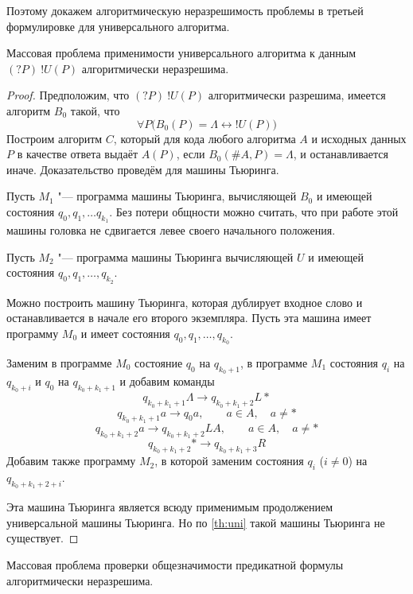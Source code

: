 Поэтому докажем алгоритмическую неразрешимость проблемы в третьей формулировке для универсального алгоритма.

\begin{lemma}
	Массовая проблема применимости универсального алгоритма к данным $ (?P)~!U(P) $ алгоритмически неразрешима.
\end{lemma}

\begin{proof}
	Предположим, что $ (?P)~!U(P) $ алгоритмически разрешима, \ie имеется алгоритм $ B_0 $ такой, что
	$$ \forall P \bigl( B_0(P) = \Lambda \leftrightarrow !U(P) \bigr) $$
	Построим алгоритм $ C $, который для кода любого алгоритма $ A $ и исходных данных $ P $ в качестве ответа выдаёт $ A(P) $, если $ B_0(\#A, P) = \Lambda $, и останавливается иначе.
	Доказательство проведём для машины Тьюринга.

	Пусть $ M_1 $ "--- программа машины Тьюринга, вычисляющей $ B_0 $ и имеющей состояния $ q_0, q_1, \dots q_{k_1} $.
	Без потери общности можно считать, что при работе этой машины головка не сдвигается левее своего начального положения.

	Пусть $ M_2 $ "--- программа машины Тьюринга вычисляющей $ U $ и имеющей состояния $ q_0, q_1, \dots, q_{k_2} $.

	Можно построить машину Тьюринга, которая дублирует входное слово и останавливается в начале его второго экземпляра.
	Пусть эта машина имеет программу $ M_0 $ и имеет состояния $ q_0, q_1, \dots, q_{k_0} $.

	Заменим в программе $ M_0 $ состояние $ q_0 $ на $ q_{k_0 + 1} $, в программе $ M_1 $ состояния $ q_i $ на $ q_{k_0 + i} $ и $ q_0 $ на $ q_{k_0 + k_1 + 1} $ и добавим команды
	$$ q_{k_0 + k_1 + 1} \Lambda \to q_{k_0 + k_1 + 2} L * $$
	$$ q_{k_0 + k_1 + 1} a \to q_0 a, \qquad a \in A, \quad a \ne * $$
	$$ q_{k_0 + k_1 + 2}a \to q_{k_0 + k_1 + 2} L A, \qquad a \in A, \quad a \ne * $$
	$$ q_{k_0 + k_1 + 2}* \to q_{k_0 + k_1 + 3}R $$
	Добавим также программу $ M_2 $, в которой заменим состояния $ q_i $ ($ i \ne 0 $) на $ q_{k_0 + k_1 + 2 + i} $.

	Эта машина Тьюринга является всюду применимым продолжением универсальной машины Тьюринга.
	Но по \autoref{th:uni} такой машины Тьюринга не существует.
\end{proof}

\begin{theorem}
	Массовая проблема проверки общезначимости предикатной формулы алгоритмически неразрешима.
\end{theorem}

